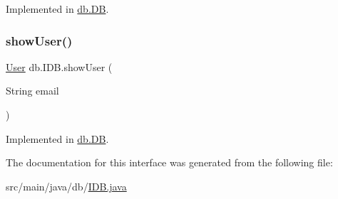 Implemented in \hyperlink{classdb_1_1_d_b_a84b36a9e2c155b1aa2868844cd157df7}{db.\+DB}.

\mbox{\label{interfacedb_1_1_i_d_b_a8dca82226b1c27ceb4b765259546513d}} 
\subsubsection{\texorpdfstring{show\+User()}{showUser()}}
{\footnotesize\ttfamily \hyperlink{classserver_1_1data_1_1_user}{User} db.\+I\+D\+B.\+show\+User (\begin{DoxyParamCaption}\item[{String}]{email }\end{DoxyParamCaption})}



Implemented in \hyperlink{classdb_1_1_d_b_a914986669ac622ef33ae344baaefa32c}{db.\+DB}.



The documentation for this interface was generated from the following file\+:\begin{DoxyCompactItemize}
\item 
src/main/java/db/\hyperlink{_i_d_b_8java}{I\+D\+B.\+java}\end{DoxyCompactItemize}
